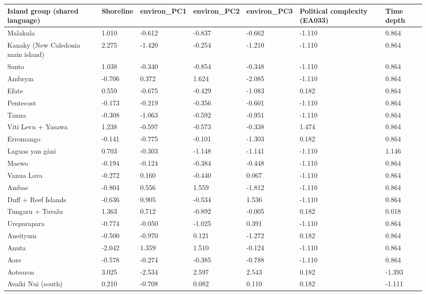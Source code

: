 \begin{longtable}{p{4.5cm}p{2cm}p{2cm}p{2cm}p{2cm}p{4cm}p{4cm}}
  \toprule
Island group (shared language) & Shoreline & environ_PC1 & environ_PC2 & environ_PC3 & Political complexity (EA033) & Time depth \\ 
  \midrule
Malakula & 1.010 & -0.612 & -0.837 & -0.662 & -1.110 & 0.864 \\ 
  Kanaky (New Caledonia main island) & 2.275 & -1.420 & -0.254 & -1.210 & -1.110 & 0.864 \\ 
  Santo & 1.038 & -0.340 & -0.854 & -0.348 & -1.110 & 0.864 \\ 
  Ambrym & -0.706 & 0.372 & 1.624 & -2.085 & -1.110 & 0.864 \\ 
  Efate & 0.559 & -0.675 & -0.429 & -1.083 & 0.182 & 0.864 \\ 
  Pentecost & -0.173 & -0.219 & -0.356 & -0.601 & -1.110 & 0.864 \\ 
  Tanna & -0.308 & -1.063 & -0.592 & -0.951 & -1.110 & 0.864 \\ 
  Viti Levu + Yasawa & 1.238 & -0.597 & -0.573 & -0.338 & 1.474 & 0.864 \\ 
  Erromango & -0.141 & -0.775 & -0.101 & -1.303 & 0.182 & 0.864 \\ 
  Laguas yan gåni & 0.703 & -0.303 & -1.148 & -1.141 & -1.110 & 1.146 \\ 
  Maewo & -0.194 & -0.124 & -0.384 & -0.448 & -1.110 & 0.864 \\ 
  Vanua Lava & -0.272 & 0.160 & -0.440 & 0.067 & -1.110 & 0.864 \\ 
  Ambae & -0.804 & 0.556 & 1.559 & -1.812 & -1.110 & 0.864 \\ 
  Duff + Reef Islands & -0.636 & 0.905 & -0.534 & 1.536 & -1.110 & 0.864 \\ 
  Tungaru + Tuvalu & 1.363 & 0.712 & -0.892 & -0.005 & 0.182 & 0.018 \\ 
  Ureparapara & -0.774 & -0.050 & -1.025 & 0.391 & -1.110 & 0.864 \\ 
  Aneityum & -0.500 & -0.970 & 0.121 & -1.272 & 0.182 & 0.864 \\ 
  Anuta & -2.042 & 1.359 & 1.510 & -0.124 & -1.110 & 0.864 \\ 
  Aore & -0.578 & -0.274 & -0.385 & -0.788 & -1.110 & 0.864 \\ 
  Aotearoa & 3.025 & -2.534 & 2.597 & 2.543 & 0.182 & -1.393 \\ 
  Avaiki Nui (south) & 0.210 & -0.708 & 0.082 & 0.110 & 0.182 & -1.111 \\ 

\end{longtable}

